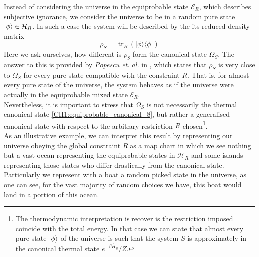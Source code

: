 \indent Instead of considering the universe in the equiprobable state $\mathcal{E}_R$, which describes subjective ignorance, we consider the universe to be in a random pure state $\mathinner{|{\phi}\rangle}\in \mathcal{H}_R$. In such a case the system will be described by the its reduced density matrix
\begin{equation}
\rho_{S}=\operatorname{tr}_{B}(|\phi\rangle\langle\phi|)
\label{CH1:Reduced_density_random_pure_state}
\end{equation}
\indent Here we ask ourselves, how different is $\rho_S$ form the canonical state $\Omega_S$. The answer to this is provided by \textit{Popescu et. al.} in \cite{popescu_entanglement_2006,popescu_foundations_2005}, which states that $\rho_S$ is very close to $\Omega_S$ for every pure state compatible with the constraint $R$.
\indent That is, for almost every pure state of the universe, the system behaves as if the universe were actually in the equiprobable mixed state $\mathcal{E}_R$.\\

\indent Nevertheless, it is important to stress that $\Omega_S$ is not necessarily the thermal canonical state \eqref{CH1:equiprobable_canonical_8}, but rather a generalised canonical state with respect to the arbitrary restriction $R$ chosen\footnote{The thermodynamic interpretation is recover is the restriction imposed coincide with the total energy. In that case we can state that  almost every pure state $\mathinner{|{\phi}\rangle}$ of the universe is such that the system $S$ is approximately in the canonical thermal state $e^{-\beta\hat{H}_S}/Z$. }.\\

\indent As an illustrative example, we can interpret this result by representing our universe obeying the global constraint $R$ as a map chart in which we see nothing but a vast ocean representing the equiprobable states in $\mathcal{H}_R$ and some islands representing those states who differ drastically from the canonical state. Particularly we represent with a boat a random picked state in the universe, as one can see, for the vast majority of random choices we have, this boat would land in a portion of this ocean.

